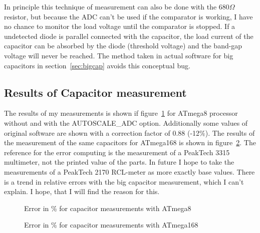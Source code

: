 In principle this technique of measurement can also be done with the \(680\Omega\) resistor, but 
because the ADC can't be used if the comparator is working, I have no chance to monitor the
load voltage until the comparator is stopped. If a undetected diode is parallel connected with
the capacitor, the load current of the capacitor can be absorbed by the diode (threshold voltage) and
the band-gap voltage will never be reached.
The method taken in actual software for big capacitors in section~\ref{sec:bigcap}
avoids this conceptual bug.

\subsection{Results of Capacitor measurement}
The results of my measurements is shown if figure~\ref{fig:mega8cap} for ATmega8 processor without and 
with the AUTOSCALE\_ADC option. Additionally some values of original software are shown with a correction factor
of 0.88 (-12\%).
The results of the measurement of the same capacitors for ATmega168 is shown in figure~\ref{fig:mega168cap}.
The reference for the error computing is the measurement of a PeakTech 3315 multimeter, not the printed value
of the parts. In future I hope to take the measurements of a PeakTech 2170 RCL-meter as more exactly
base values.
There is a trend in relative errors with the big capacitor measurement, which I can't explain.
I hope, that I will find the reason for this.

\begin{figure}[H]
\centering

\caption{Error in \% for capacitor measurements with ATmega8 }
\label{fig:mega8cap}
\end{figure}

\begin{figure}[H]
\centering

\caption{Error in \% for capacitor measurements with ATmega168 }
\label{fig:mega168cap}
\end{figure}

